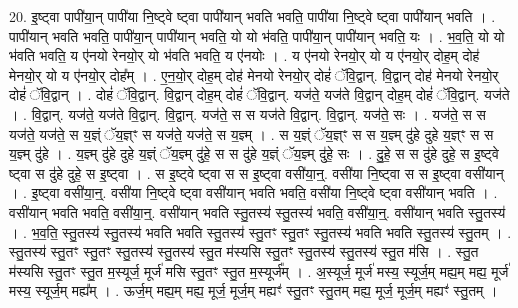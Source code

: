 \documentclass[17pt]{extarticle}
\begin{document}
20. इ॒ष्ट्वा पापी॑या॒न् पापी॑या नि॒ष्ट्वे ष्ट्वा पापी॑यान् भवति भवति॒ पापी॑या नि॒ष्ट्वे ष्ट्वा पापी॑यान् भवति । . पापी॑यान् भवति भवति॒ पापी॑या॒न् पापी॑यान् भवति॒ यो यो भ॑वति॒ पापी॑या॒न् पापी॑यान् भवति॒ यः । . भ॒व॒ति॒ यो यो भ॑वति भवति॒ य ए॑नयो रेनयो॒र् यो भ॑वति भवति॒ य ए॑नयोः । . य ए॑नयो रेनयो॒र् यो य ए॑नयो॒र् दोह॒म् दोह॑ मेनयो॒र् यो य ए॑नयो॒र् दोह᳚म् । . ए॒न॒यो॒र् दोह॒म् दोह॑ मेनयो रेनयो॒र् दोहं॑ ॅवि॒द्वान्. वि॒द्वान् दोह॑ मेनयो रेनयो॒र् दोहं॑ ॅवि॒द्वान् । . दोहं॑ ॅवि॒द्वान्. वि॒द्वान् दोह॒म् दोहं॑ ॅवि॒द्वान्. यज॑ते॒ यज॑ते वि॒द्वान् दोह॒म् दोहं॑ ॅवि॒द्वान्. यज॑ते । . वि॒द्वान्. यज॑ते॒ यज॑ते वि॒द्वान्. वि॒द्वान्. यज॑ते॒ स स यज॑ते वि॒द्वान्. वि॒द्वान्. यज॑ते॒ सः । . यज॑ते॒ स स यज॑ते॒ यज॑ते॒ स य॒ज्ञ्ं ॅय॒ज्ञ्ꣳ स यज॑ते॒ यज॑ते॒ स य॒ज्ञ्म् । . स य॒ज्ञ्ं ॅय॒ज्ञ्ꣳ स स य॒ज्ञ्म् दु॑हे दुहे य॒ज्ञ्ꣳ स स य॒ज्ञ्म् दु॑हे । . य॒ज्ञ्म् दु॑हे दुहे य॒ज्ञ्ं ॅय॒ज्ञ्म् दु॑हे॒ स स दु॑हे य॒ज्ञ्ं ॅय॒ज्ञ्म् दु॑हे॒ सः । . दु॒हे॒ स स दु॑हे दुहे॒ स इ॒ष्ट्वे ष्ट्वा स दु॑हे दुहे॒ स इ॒ष्ट्वा । . स इ॒ष्ट्वे ष्ट्वा स स इ॒ष्ट्वा वसी॑या॒न्॒. वसी॑या नि॒ष्ट्वा स स इ॒ष्ट्वा वसी॑यान् । . इ॒ष्ट्वा वसी॑या॒न्॒. वसी॑या नि॒ष्ट्वे ष्ट्वा वसी॑यान् भवति भवति॒ वसी॑या नि॒ष्ट्वे ष्ट्वा वसी॑यान् भवति । . वसी॑यान् भवति भवति॒ वसी॑या॒न्॒. वसी॑यान् भवति स्तु॒तस्य॑ स्तु॒तस्य॑ भवति॒ वसी॑या॒न्॒. वसी॑यान् भवति स्तु॒तस्य॑ । . भ॒व॒ति॒ स्तु॒तस्य॑ स्तु॒तस्य॑ भवति भवति स्तु॒तस्य॑ स्तु॒तꣳ स्तु॒तꣳ स्तु॒तस्य॑ भवति भवति स्तु॒तस्य॑ स्तु॒तम् । . स्तु॒तस्य॑ स्तु॒तꣳ स्तु॒तꣳ स्तु॒तस्य॑ स्तु॒तस्य॑ स्तु॒त म॑स्यसि स्तु॒तꣳ स्तु॒तस्य॑ स्तु॒तस्य॑ स्तु॒त म॑सि । . स्तु॒त म॑स्यसि स्तु॒तꣳ स्तु॒त म॒स्यूर्ज॒ मूर्ज॑ मसि स्तु॒तꣳ स्तु॒त म॒स्यूर्ज᳚म् । . अ॒स्यूर्ज॒ मूर्ज॑ मस्य॒ स्यूर्ज॒म् मह्य॒म् मह्य॒ मूर्ज॑ मस्य॒ स्यूर्ज॒म् मह्य᳚म् । . ऊर्ज॒म् मह्य॒म् मह्य॒ मूर्ज॒ मूर्ज॒म् मह्यꣳ॑ स्तु॒तꣳ स्तु॒तम् मह्य॒ मूर्ज॒ मूर्ज॒म् मह्यꣳ॑ स्तु॒तम् । \newline
\end{document}
